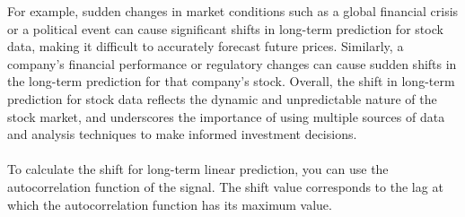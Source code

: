     For example, sudden changes in market conditions such as a global financial crisis or a political event can cause significant shifts in long-term
    prediction for stock data, making it difficult to accurately forecast future prices. Similarly, a company's financial performance or regulatory
    changes can cause sudden shifts in the long-term prediction for that company's stock.
    Overall, the shift in long-term prediction for stock data reflects the dynamic and unpredictable nature of the stock market,
    and underscores the importance of using multiple sources of data and analysis techniques to make informed investment decisions.\\
    \\
    To calculate the shift for long-term linear prediction, you can use the autocorrelation function of the signal.
    The shift value corresponds to the lag at which the autocorrelation function has its maximum value.
